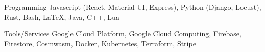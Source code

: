 



\begin{cvskills}

  \cvskill
    {Programming} %
    {Javascript (React, Material-UI, Express), Python (Django, Locust), Rust, Bash, \LaTeX, Java, C++, Lua} %

  \cvskill
    {Tools/Services} %
    {Google Cloud Platform, Google Cloud Computing, Firebase, Firestore, Cosmwasm, Docker, Kubernetes, Terraform, Stripe} %

\end{cvskills}


% 
% 
% 
% 
% 
% 
